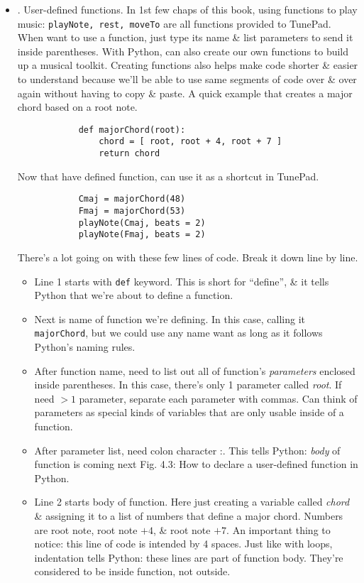 \documentclass{article}
\begin{document}
\begin{itemize}
\begin{itemize}
		But, it would be tedious \& error prone to write out {\tt[root, root + 4, root + 7]} every time we wanted to use a major chord. Fortunately, Python gives us a powerful tool for exactly this kind of situation: {\it user-defined functions}.
		\item {. User-defined functions.} In 1st few chaps of this book, using functions to play music: {\tt playNote, rest, moveTo} are all functions provided to TunePad. When want to use a function, just type its name \& list parameters to send it inside parentheses. With Python, can also create our own functions to build up a musical toolkit. Creating functions also helps make code shorter \& easier to understand because we'll be able to use same segments of code over \& over again without having to copy \& paste. A quick example that creates a major chord based on a root note.
		\begin{verbatim}
			def majorChord(root):
			    chord = [ root, root + 4, root + 7 ]
			    return chord
		\end{verbatim}
		Now that have defined function, can use it as a shortcut in TunePad.
		\begin{verbatim}
			Cmaj = majorChord(48)
			Fmaj = majorChord(53)
			playNote(Cmaj, beats = 2)
			playNote(Fmaj, beats = 2)
		\end{verbatim}
		There's a lot going on with these few lines of code. Break it down line by line.
		\begin{itemize}
			\item Line 1 starts with {\tt def} keyword. This is short for ``define'', \& it tells Python that we're about to define a function.
			\item Next is name of function we're defining. In this case, calling it {\tt majorChord}, but we could use any name want as long as it follows Python's naming rules.
			\item After function name, need to list out all of function's {\it parameters} enclosed inside parentheses. In this case, there's only 1 parameter called {\it root}. If need $> 1$ parameter, separate each parameter with commas. Can think of parameters as special kinds of variables that are only usable inside of a function.
			\item After parameter list, need colon character :. This tells Python: {\it body} of function is coming next {\sf Fig. 4.3: How to declare a user-defined function in Python}.
			\item Line 2 starts body of function. Here just creating a variable called {\it chord} \& assigning it to a list of numbers that define a major chord. Numbers are root note, root note $+4$, \& root note $+7$. An important thing to notice: this line of code is intended by 4 spaces. Just like with loops, indentation tells Python: these lines are part of function body. They're considered to be inside function, not outside.

\end{itemize}
\end{itemize}
\end{itemize}
\end{document}
